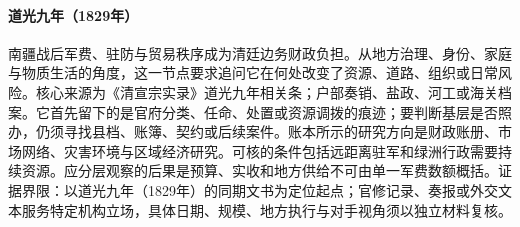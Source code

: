 \hypertarget{social:EQ-1829-XINJIANG-FINANCE}{}\paragraph{道光九年（1829年）}南疆战后军费、驻防与贸易秩序成为清廷边务财政负担。从地方治理、身份、家庭与物质生活的角度，这一节点要求追问它在何处改变了资源、道路、组织或日常风险。核心来源为《清宣宗实录》道光九年相关条；户部奏销、盐政、河工或海关档案。它首先留下的是官府分类、任命、处置或资源调拨的痕迹；要判断基层是否照办，仍须寻找县档、账簿、契约或后续案件。账本所示的研究方向是财政账册、市场网络、灾害环境与区域经济研究。可核的条件包括远距离驻军和绿洲行政需要持续资源。应分层观察的后果是预算、实收和地方供给不可由单一军费数额概括。证据界限：以道光九年（1829年）的同期文书为定位起点；官修记录、奏报或外交文本服务特定机构立场，具体日期、规模、地方执行与对手视角须以独立材料复核。
